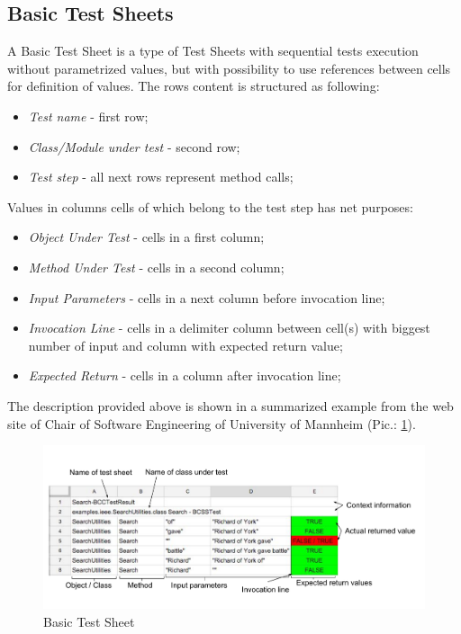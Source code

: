  \subsection{Basic Test Sheets}
A Basic Test Sheet is a type of Test Sheets with sequential tests execution without parametrized values, but with possibility to use references between cells for definition of values.
The rows content is structured as following:
\begin{itemize}
	\item \textit{Test name} - first row;
	\item \textit{Class/Module under test} - second row;
	\item \textit{Test step} - all next rows represent method calls;
\end{itemize}

Values in columns cells of which belong to the test step has net purposes:
\begin{itemize}
	\item \textit{Object Under Test} - cells in a first column;
	\item \textit{Method Under Test} - cells in a second column;
	\item \textit{Input Parameters} - cells in a next column before invocation line;
	\item \textit{Invocation Line} - cells in a delimiter column between cell(s) with biggest number of input and column with expected return value;
	\item \textit{Expected Return} - cells in a column after invocation line;
\end{itemize}

The description provided above is shown in a summarized example from the web site of Chair of Software Engineering of University of Mannheim (Pic.: \ref{fig:BasictestSheet}).
  \begin{figure}[ht]
  	\label{fig:BasictestSheet}
    \centering
    \includegraphics[width=\textwidth]{grafiken/basic_test_sheet}
     \caption{Basic Test Sheet}
  \end{figure}



